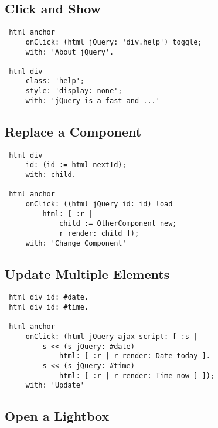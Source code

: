 \documentclass[a4paper,10pt,twoside]{book}
\begin{document}
\subsection{Click and Show}
\label{book:web20:jquery:howto:clickandshow}

\begin{lstlisting}
 html anchor
     onClick: (html jQuery: 'div.help') toggle;
     with: 'About jQuery'.
 
 html div
     class: 'help';
     style: 'display: none';
     with: 'jQuery is a fast and ...'
\end{lstlisting}

\subsection{Replace a Component}
\label{book:web20:jquery:howto:replacecomponent}

\begin{lstlisting}
 html div
     id: (id := html nextId);
     with: child.
 
 html anchor
     onClick: ((html jQuery id: id) load
         html: [ :r | 
             child := OtherComponent new;
             r render: child ]);
     with: 'Change Component'
\end{lstlisting}

\subsection{Update Multiple Elements}
\label{book:web20:jquery:howto:updatemultipleelements}

\begin{lstlisting}
 html div id: #date.
 html div id: #time.
 
 html anchor
     onClick: (html jQuery ajax script: [ :s |
         s << (s jQuery: #date)
             html: [ :r | r render: Date today ].
         s << (s jQuery: #time)
             html: [ :r | r render: Time now ] ]);
     with: 'Update'
\end{lstlisting}

\subsection{Open a Lightbox}
\label{book:web20:jquery:howto:openlightbox}
\end{document}
